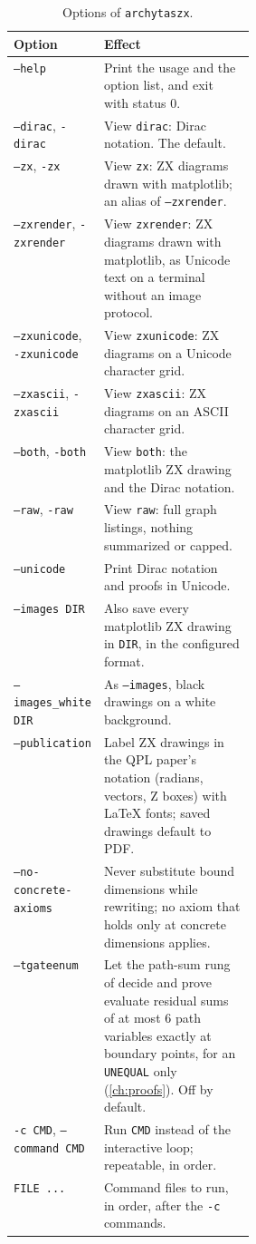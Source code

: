 \begin{table}[H]
\centering\small
\begin{tabularx}{\linewidth}{@{}>{\raggedright\arraybackslash}p{0.31\linewidth}X@{}}
\toprule
Option & Effect \\
\midrule
\texttt{--help} & Print the usage and the option list, and exit with status 0. \\
\texttt{--dirac}, \texttt{-dirac} & View \texttt{dirac}: Dirac notation. The default. \\
\texttt{--zx}, \texttt{-zx} & View \texttt{zx}: ZX diagrams drawn with matplotlib; an alias of \texttt{--zxrender}. \\
\texttt{--zxrender}, \texttt{-zxrender} & View \texttt{zxrender}: ZX diagrams drawn with matplotlib, as Unicode text on a terminal without an image protocol. \\
\texttt{--zxunicode}, \texttt{-zxunicode} & View \texttt{zxunicode}: ZX diagrams on a Unicode character grid. \\
\texttt{--zxascii}, \texttt{-zxascii} & View \texttt{zxascii}: ZX diagrams on an ASCII character grid. \\
\texttt{--both}, \texttt{-both} & View \texttt{both}: the matplotlib ZX drawing and the Dirac notation. \\
\texttt{--raw}, \texttt{-raw} & View \texttt{raw}: full graph listings, nothing summarized or capped. \\
\texttt{--unicode} & Print Dirac notation and proofs in Unicode. \\
\texttt{--images DIR} & Also save every matplotlib ZX drawing in \texttt{DIR}, in the configured format. \\
\texttt{--images\_white DIR} & As \texttt{--images}, black drawings on a white background. \\
\texttt{--publication} & Label ZX drawings in the QPL paper's notation (radians, vectors, Z boxes) with LaTeX fonts; saved drawings default to PDF. \\
\texttt{--no-concrete-axioms} & Never substitute bound dimensions while rewriting; no axiom that holds only at concrete dimensions applies. \\
\texttt{--tgateenum} & Let the path-sum rung of decide and prove evaluate residual sums of at most 6 path variables exactly at boundary points, for an \texttt{UNEQUAL} only (\cref{ch:proofs}). Off by default. \\
\texttt{-c CMD}, \texttt{--command CMD} & Run \texttt{CMD} instead of the interactive loop; repeatable, in order. \\
\texttt{FILE ...} & Command files to run, in order, after the \texttt{-c} commands. \\
\bottomrule
\end{tabularx}
\caption{Options of \texttt{archytaszx}.}
\label{tab:shell-options}
\end{table}

